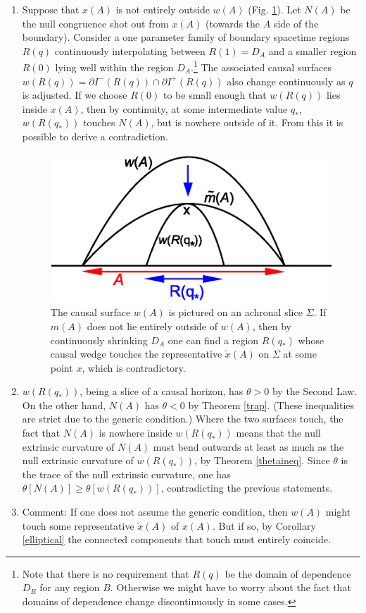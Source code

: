 \documentclass[12pt]{article}
\begin{document}
\begin{enumerate}[resume]
\begin{enumerate}
	\item Suppose that $x(A)$ is not entirely outside $w(A)$ (Fig. \ref{wvsm}).  Let $N(A)$ be the null congruence shot out from $x(A)$ (towards the $A$ side of the boundary).  Consider a one parameter family of boundary spacetime regions $R(q)$ continuously interpolating between $R(1) = D_A$ and a smaller region $R(0)$ lying well within the region $D_A$.\footnote{Note that there is no requirement that $R(q)$ be the domain of dependence $D_B$ for any region $B$.  Otherwise we might have to worry about the fact that domains of dependence change discontinuously in some cases.}  The associated causal surfaces $w(R(q)) = \partial I^-(R(q)) \cap \partial I^+(R(q))$ also change continuously as $q$ is adjusted.  If we choose $R(0)$ to be small enough that $w(R(q))$ lies inside $x(A)$, then by continuity, at some intermediate value $q_*$, $w(R(q_*))$ touches $N(A)$, but is nowhere outside of it.  From this it is possible to derive a contradiction.
\begin{figure}[ht]
\centering
\includegraphics[width=.47\textwidth]{wvsm.eps}
\caption{\footnotesize The causal surface $w(A)$ is pictured on an achronal slice $\Sigma$.  If $m(A)$ does not lie entirely outside of $w(A)$, then by continuously shrinking $D_A$ one can find a region $R(q_*)$ whose causal wedge touches the representative $\tilde{x}(A)$ on $\Sigma$ at some point $x$, which is contradictory.}\label{wvsm}
\end{figure}\label{wvsm}
	\item $w(R(q_*))$, being a slice of a causal horizon, has $\theta > 0$ by the Second Law.  On the other hand, $N(A)$ has $\theta < 0$ by Theorem \ref{trap}.  (These inequalities are strict due to the generic condition.) Where the two surfaces touch, the fact that $N(A)$ is nowhere inside $w(R(q_*))$ means that the null extrinsic curvature of $N(A)$ must bend outwards at least as much as the null extrinsic curvature of $w(R(q_*))$, by Theorem \ref{thetaineq}.  Since $\theta$ is the trace of the null extrinsic curvature, one has $\theta[N(A)] \ge \theta[w(R(q_*))]$, contradicting the previous statements.
	\item Comment: If one does not assume the generic condition, then $w(A)$ might touch some representative $\tilde{x}(A)$ of $x(A)$.  But if so, by Corollary \ref{elliptical} the connected components that touch must entirely coincide.

\end{enumerate}
\end{enumerate}
\end{document}
